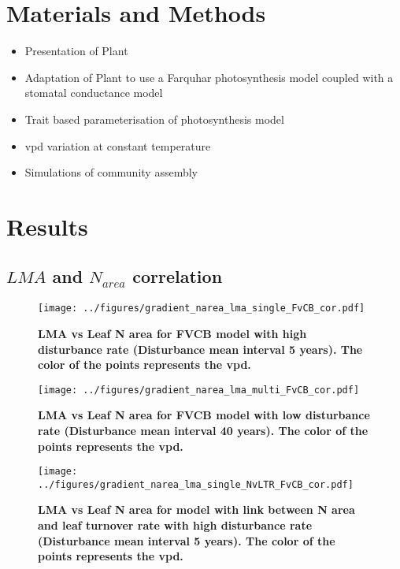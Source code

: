 \documentclass[a4paper,11pt]{article}
\begin{document}
\section{Materials and Methods}


\begin{itemize}

\item Presentation of Plant

\item Adaptation of Plant to use a Farquhar photosynthesis model coupled with a stomatal conductance model

\item Trait based parameterisation of photosynthesis model

\item vpd variation at constant temperature
  
\item Simulations of community assembly 

\end{itemize}



\clearpage

\section{Results}

\subsection{$LMA$ and $N_{area}$ correlation}

\begin{figure}[ht]
\centering
\texttt{[image: ../figures/gradient\_narea\_lma\_single\_FvCB\_cor.pdf]}
\caption{\textbf{LMA vs Leaf N area for FVCB model with high disturbance rate (Disturbance mean interval 5 years). The color of the points represents the vpd.}
\label{fig:lma_narea_cor_single}}
\end{figure}


\begin{figure}[ht]
\centering
\texttt{[image: ../figures/gradient\_narea\_lma\_multi\_FvCB\_cor.pdf]}
\caption{\textbf{LMA vs Leaf N area for FVCB model with low disturbance rate (Disturbance mean interval 40 years). The color of the points represents the vpd.}
\label{fig:lma_narea_cor_multi}}
\end{figure}


\begin{figure}[ht]
\centering
\texttt{[image: ../figures/gradient\_narea\_lma\_single\_NvLTR\_FvCB\_cor.pdf]}
\caption{\textbf{LMA vs Leaf N area for model with link between N area and leaf turnover rate with high disturbance rate (Disturbance mean interval 5 years). The color of the points represents the vpd.}
\label{fig:lma_narea_cor_single_NvLTR}}
\end{figure}
\end{document}
